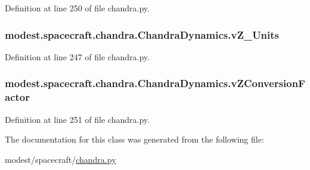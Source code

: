 Definition at line 250 of file chandra.\+py.

\subsubsection[{\texorpdfstring{v\+Z\+\_\+\+Units}{vZ_Units}}]{\setlength{\rightskip}{0pt plus 5cm}modest.\+spacecraft.\+chandra.\+Chandra\+Dynamics.\+v\+Z\+\_\+\+Units}\hypertarget{classmodest_1_1spacecraft_1_1chandra_1_1ChandraDynamics_aba402140c63ead7dda6f2c5f98a260d6}{}\label{classmodest_1_1spacecraft_1_1chandra_1_1ChandraDynamics_aba402140c63ead7dda6f2c5f98a260d6}


Definition at line 247 of file chandra.\+py.

\subsubsection[{\texorpdfstring{v\+Z\+Conversion\+Factor}{vZConversionFactor}}]{\setlength{\rightskip}{0pt plus 5cm}modest.\+spacecraft.\+chandra.\+Chandra\+Dynamics.\+v\+Z\+Conversion\+Factor}\hypertarget{classmodest_1_1spacecraft_1_1chandra_1_1ChandraDynamics_a5e692740d2af9b642b24584e00d4aed1}{}\label{classmodest_1_1spacecraft_1_1chandra_1_1ChandraDynamics_a5e692740d2af9b642b24584e00d4aed1}


Definition at line 251 of file chandra.\+py.



The documentation for this class was generated from the following file\+:\begin{DoxyCompactItemize}
\item 
modest/spacecraft/\hyperlink{chandra_8py}{chandra.\+py}\end{DoxyCompactItemize}
